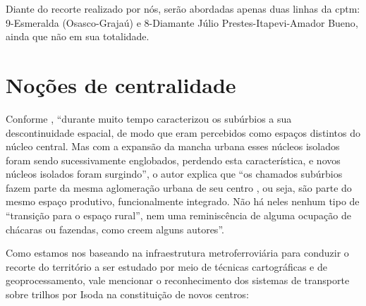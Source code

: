 %

	Diante do recorte realizado por nós, serão abordadas apenas duas linhas da \gls{cptm}: 9-Esmeralda (Osasco-Grajaú) e 8-Diamante {Júlio Prestes-Itapevi-Amador Bueno}, ainda que não em sua totalidade.

	\section{Noções de centralidade}
	
	Conforme , ``durante muito tempo caracterizou  os  subúrbios  a  sua  descontinuidade  espacial,  de  modo que  eram  percebidos  como  espaços  distintos  do  núcleo  central.  Mas com  a  expansão  da  mancha  urbana  esses  núcleos  isolados  foram sendo  sucessivamente  englobados,  perdendo  esta  característica,  e novos  núcleos  isolados  foram  surgindo'', o autor explica que ``os chamados subúrbios fazem parte da mesma  aglomeração  urbana  de  seu  centro ,  ou  seja,  são  parte  do mesmo  espaço  produtivo,  funcionalmente  integrado.  Não  há  neles nenhum  tipo  de  “transição  para  o  espaço  rural”,  nem  uma reminiscência  de  alguma  ocupação  de  chácaras  ou  fazendas, como creem alguns autores''.
	
	Como estamos nos baseando na infraestrutura metroferroviária para conduzir o recorte do território a ser estudado por meio de técnicas cartográficas e de geoprocessamento, vale mencionar o reconhecimento dos sistemas de transporte sobre trilhos por Isoda na constituição de novos centros:
	
